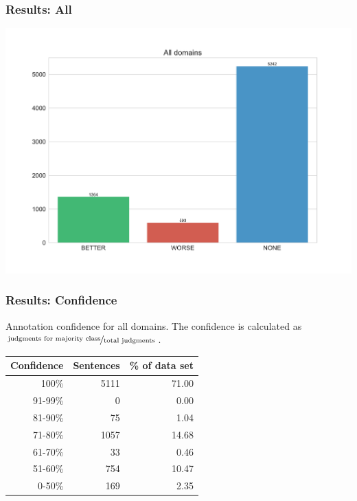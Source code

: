 \documentclass[11pt,aspectratio=169]{beamer}
\begin{document}
    \begin{frame}
        \frametitle{Results: All}
        \begin{center}
            \includegraphics[scale=0.3]{images/Alldomains-dist.pdf}
        \end{center}
    \end{frame}

    \begin{frame}
        \frametitle{Results: Confidence}

        Annotation confidence for all domains. The confidence is calculated as $\nicefrac{\text{judgments for majority class}}{\text{total judgments}}$.

        \begin{center}
            \begin{tabular}{@{}rrr@{}}
                \toprule
                Confidence & Sentences & \% of data set \\
                \midrule
                100\%    & 5111 & 71.00     \\
                91-99\%    & 0 & 0.00     \\
                81-90\%    & 75 & 1.04     \\
                71-80\%    & 1057 & 14.68     \\
                61-70\%    & 33 & 0.46     \\
                51-60\%    & 754 & 10.47     \\
                0-50\%    & 169 & 2.35     \\
                \bottomrule
            \end{tabular}

        \end{center}
    \end{frame}
\end{document}
